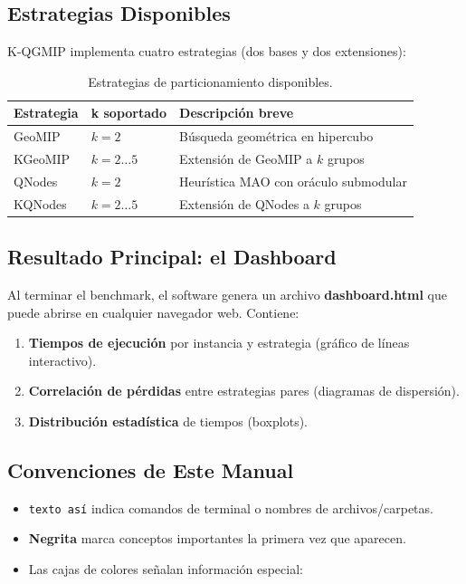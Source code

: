 \subsection{Estrategias Disponibles}

K-QGMIP implementa cuatro estrategias (dos bases y dos extensiones):

\begin{table}[H]
    \centering
    \caption{Estrategias de particionamiento disponibles.}
    \begin{tabular}{lll}
        \toprule
        \textbf{Estrategia} & \textbf{k soportado} & \textbf{Descripción breve} \\
        \midrule
        GeoMIP        & $k=2$ & Búsqueda geométrica en hipercubo \\
        KGeoMIP       & $k=2\ldots5$ & Extensión de GeoMIP a $k$ grupos \\
        QNodes        & $k=2$ & Heurística MAO con oráculo submodular \\
        KQNodes       & $k=2\ldots5$ & Extensión de QNodes a $k$ grupos \\
        \bottomrule
    \end{tabular}
\end{table}

\subsection{Resultado Principal: el Dashboard}

Al terminar el benchmark, el software genera un archivo \textbf{dashboard.html} que puede abrirse en cualquier navegador web. Contiene:

\begin{enumerate}[label=\textbf{\arabic*.}]
    \item \textbf{Tiempos de ejecución} por instancia y estrategia (gráfico de líneas interactivo).
    \item \textbf{Correlación de pérdidas} entre estrategias pares (diagramas de dispersión).
    \item \textbf{Distribución estadística} de tiempos (boxplots).
\end{enumerate}

\subsection{Convenciones de Este Manual}

\begin{itemize}[itemsep=4pt]
    \item \lstinline|texto así| indica comandos de terminal o nombres de archivos/carpetas.
    \item \textbf{Negrita} marca conceptos importantes la primera vez que aparecen.
    \item Las cajas de colores señalan información especial:
\end{itemize}

